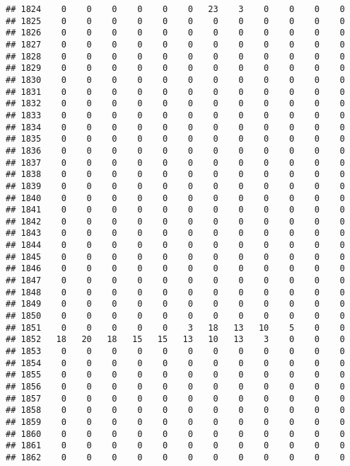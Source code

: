 \documentclass[]{article}
\begin{document}
\begin{verbatim}
## 1824    0    0    0    0    0    0   23    3    0    0    0    0
## 1825    0    0    0    0    0    0    0    0    0    0    0    0
## 1826    0    0    0    0    0    0    0    0    0    0    0    0
## 1827    0    0    0    0    0    0    0    0    0    0    0    0
## 1828    0    0    0    0    0    0    0    0    0    0    0    0
## 1829    0    0    0    0    0    0    0    0    0    0    0    0
## 1830    0    0    0    0    0    0    0    0    0    0    0    0
## 1831    0    0    0    0    0    0    0    0    0    0    0    0
## 1832    0    0    0    0    0    0    0    0    0    0    0    0
## 1833    0    0    0    0    0    0    0    0    0    0    0    0
## 1834    0    0    0    0    0    0    0    0    0    0    0    0
## 1835    0    0    0    0    0    0    0    0    0    0    0    0
## 1836    0    0    0    0    0    0    0    0    0    0    0    0
## 1837    0    0    0    0    0    0    0    0    0    0    0    0
## 1838    0    0    0    0    0    0    0    0    0    0    0    0
## 1839    0    0    0    0    0    0    0    0    0    0    0    0
## 1840    0    0    0    0    0    0    0    0    0    0    0    0
## 1841    0    0    0    0    0    0    0    0    0    0    0    0
## 1842    0    0    0    0    0    0    0    0    0    0    0    0
## 1843    0    0    0    0    0    0    0    0    0    0    0    0
## 1844    0    0    0    0    0    0    0    0    0    0    0    0
## 1845    0    0    0    0    0    0    0    0    0    0    0    0
## 1846    0    0    0    0    0    0    0    0    0    0    0    0
## 1847    0    0    0    0    0    0    0    0    0    0    0    0
## 1848    0    0    0    0    0    0    0    0    0    0    0    0
## 1849    0    0    0    0    0    0    0    0    0    0    0    0
## 1850    0    0    0    0    0    0    0    0    0    0    0    0
## 1851    0    0    0    0    0    3   18   13   10    5    0    0
## 1852   18   20   18   15   15   13   10   13    3    0    0    0
## 1853    0    0    0    0    0    0    0    0    0    0    0    0
## 1854    0    0    0    0    0    0    0    0    0    0    0    0
## 1855    0    0    0    0    0    0    0    0    0    0    0    0
## 1856    0    0    0    0    0    0    0    0    0    0    0    0
## 1857    0    0    0    0    0    0    0    0    0    0    0    0
## 1858    0    0    0    0    0    0    0    0    0    0    0    0
## 1859    0    0    0    0    0    0    0    0    0    0    0    0
## 1860    0    0    0    0    0    0    0    0    0    0    0    0
## 1861    0    0    0    0    0    0    0    0    0    0    0    0
## 1862    0    0    0    0    0    0    0    0    0    0    0    0

\end{verbatim}
\end{document}
